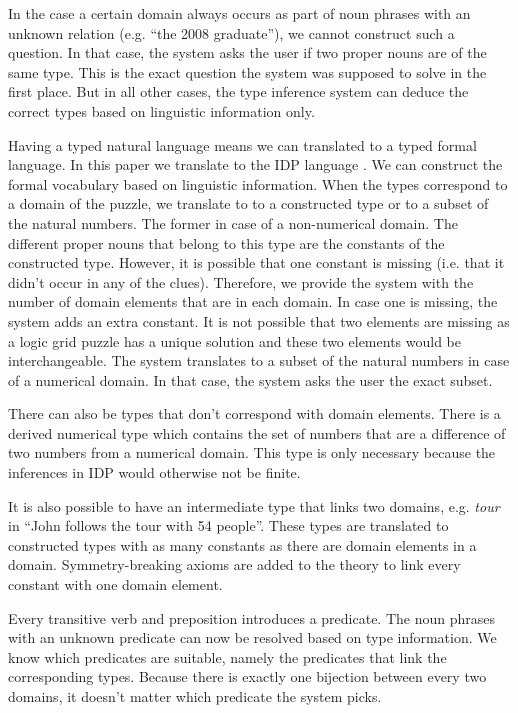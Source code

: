 In the case a certain domain always occurs as part of noun phrases with an unknown relation (e.g. ``the 2008 graduate''), we cannot construct such a question. In that case, the system asks the user if two proper nouns are of the same type. This is the exact question the system was supposed to solve in the first place. But in all other cases, the type inference system can deduce the correct types based on linguistic information only.

Having a typed natural language means we can translated to a typed formal language. In this paper we translate to the IDP language \cite{IDP}. We can construct the formal vocabulary based on linguistic information. When the types correspond to a domain of the puzzle, we translate to to a constructed type or to a subset of the natural numbers. The former in case of a non-numerical domain. The different proper nouns that belong to this type are the constants of the constructed type. However, it is possible that one constant is missing (i.e. that it didn't occur in any of the clues). Therefore, we provide the system with the number of domain elements that are in each domain. In case one is missing, the system adds an extra constant. It is not possible that two elements are missing as a logic grid puzzle has a unique solution and these two elements would be interchangeable. The system translates to a subset of the natural numbers in case of a numerical domain. In that case, the system asks the user the exact subset.

There can also be types that don't correspond with domain elements. There is a derived numerical type which contains the set of numbers that are a difference of two numbers from a numerical domain. This type is only necessary because the inferences in IDP would otherwise not be finite.

It is also possible to have an intermediate type that links two domains, e.g. \textit{tour} in ``John follows the tour with 54 people''. These types are translated to constructed types with as many constants as there are domain elements in a domain. Symmetry-breaking axioms are added to the theory to link every constant with one domain element.

Every transitive verb and preposition introduces a predicate. The noun phrases with an unknown predicate can now be resolved based on type information. We know which predicates are suitable, namely the predicates that link the corresponding types. Because there is exactly one bijection between every two domains, it doesn't matter which predicate the system picks.

